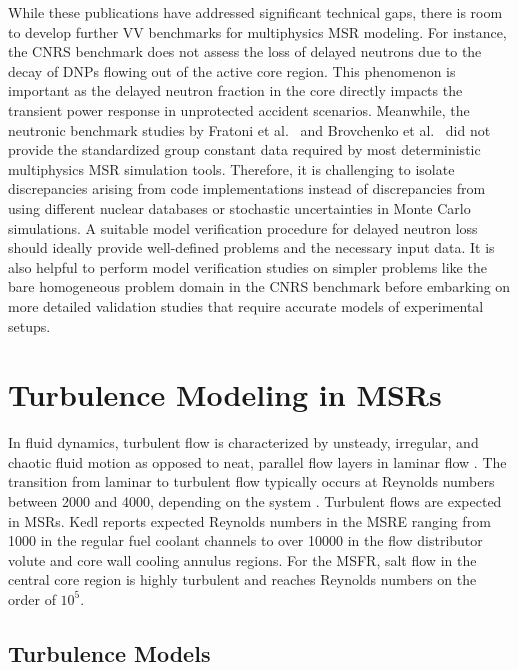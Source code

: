 While these publications have addressed significant technical gaps, there is room to develop
further \gls{VV} benchmarks for multiphysics \gls{MSR} modeling. For instance, the CNRS benchmark
does not assess the loss of delayed neutrons due to the decay of \glspl{DNP} flowing out of the
active core region. This phenomenon is important as the delayed neutron fraction in the core
directly impacts the transient power response in unprotected accident scenarios. Meanwhile, the
neutronic benchmark studies by Fratoni et al.\ \cite{fratoni_molten_2020} and Brovchenko et al.\
\cite{brovchenko_neutronic_2019} did not provide the standardized group constant data required by
most deterministic multiphysics \gls{MSR} simulation tools. Therefore, it is challenging to isolate
discrepancies arising from code implementations instead of discrepancies from using different
nuclear databases or stochastic uncertainties in Monte Carlo simulations. A suitable model
verification procedure for delayed neutron loss should ideally provide well-defined problems and
the necessary input data. It is also helpful to perform model verification studies on simpler
problems like the bare homogeneous problem domain in the CNRS benchmark before embarking on more
detailed validation studies that require accurate models of experimental setups.

\section{Turbulence Modeling in MSRs} \label{sec:lit-turb}

In fluid dynamics, turbulent flow is characterized by unsteady, irregular, and
chaotic fluid motion as opposed to neat, parallel flow layers in laminar flow
\cite{pope_turbulent_2000}. The transition from laminar to turbulent flow
typically occurs at Reynolds numbers between 2000 and 4000, depending on the
system \cite{pope_turbulent_2000}. Turbulent flows are expected in \glspl{MSR}.
Kedl \cite{kedl_fluid_1970} reports expected Reynolds numbers in the \gls{MSRE}
ranging from 1000 in the regular fuel coolant channels to over 10000 in the
flow distributor volute and core wall cooling annulus regions. For the
\gls{MSFR}, salt flow in the central core region is highly turbulent and
reaches Reynolds numbers on the order of $10^5$.

\subsection{Turbulence Models}

